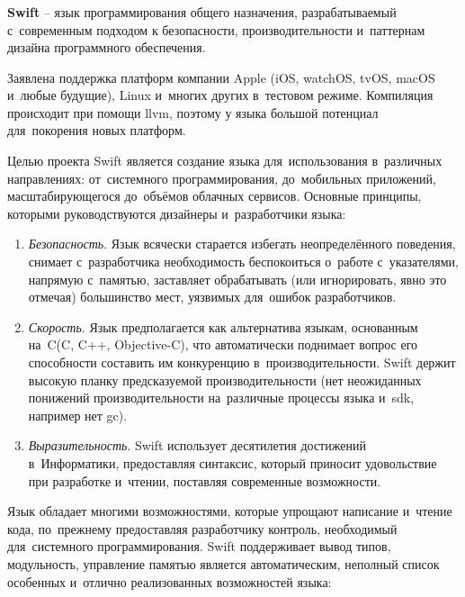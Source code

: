 \subsubsection{}
\label{sec:development:arch:ios:swift}

\textbf{Swift} -- язык программирования общего назначения, разрабатываемый с~современным подходом к безопасности, производительности и~паттернам дизайна программного обеспечения\cite{swift:about}. 

Заявлена поддержка платформ компании Apple (iOS, watchOS, tvOS, macOS и~любые будущие), Linux и~многих других в~тестовом режиме. Компиляция происходит при помощи \gls{llvm}, поэтому у языка большой потенциал для~покорения новых платформ.

Целью проекта Swift является создание языка для~использования в~различных направлениях: от~системного программирования, до~мобильных приложений, масштабирующегося до~объёмов облачных сервисов. Основные принципы, которыми руководствуются дизайнеры и~разработчики языка:

\begin{enumerate}
	\item \emph{Безопасность}. Язык всячески старается избегать неопределённого поведения, снимает с~разработчика необходимость беспокоиться о~работе с~указателями, напрямую с~памятью, заставляет обрабатывать (или игнорировать, явно это отмечая) большинство мест, уязвимых для~ошибок разработчиков.
	\item \emph{Скорость}. Язык предполагается как альтернатива языкам, основанным на~C(C, C++, Objective-C), что автоматически поднимает вопрос его способности составить им конкуренцию в~производительности. Swift держит высокую планку предсказуемой производительности (нет неожиданных понижений производительности на~различные процессы языка и~\gls{sdk}, например нет \gls{gc}).
	\item \emph{Выразительность}. Swift использует десятилетия достижений в~Информатики, предоставляя синтаксис, который приносит удовольствие при разработке и~чтении, поставляя современные возможности.  
\end{enumerate}

Язык обладает многими возможностями, которые упрощают написание и~чтение кода, по~прежнему предоставляя разработчику контроль, необходимый для~системного программирования. Swift поддерживает вывод типов, модульность, управление памятью является автоматическим, неполный список особенных и~отлично реализованных возможностей языка:

